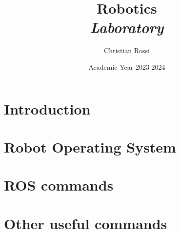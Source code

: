 \documentclass[12pt, a4paper]{report}
\title{Robotics \\ \textit{Laboratory}}
\author{Christian Rossi}
\date{Academic Year 2023-2024}
\begin{document}
    \maketitle

    

    \cleardoublepage

    \tableofcontents

    \cleardoublepage

    \chapter{Introduction}
    
    

    \chapter{Robot Operating System}
    
    
    


    \chapter{ROS commands}
    
    

    \appendix
    \chapter{Other useful commands}
    
    
\end{document}
